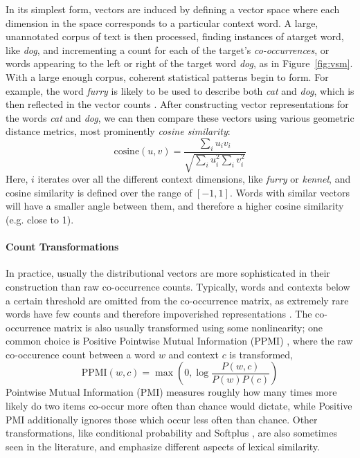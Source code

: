\documentclass[12pt]{article}
\begin{document}
In its simplest form, vectors are induced by defining a vector space where
each dimension in the space corresponds to a particular context word. A large,
unannotated corpus of text is then processed, finding instances of atarget word,
like {\em dog}, and incrementing a count for each of the target's {\em
co-occurrences}, or words appearing to the left or right of the target word
{\em dog}, as in Figure~\ref{fig:vsm}. With a large enough corpus, coherent
statistical patterns begin to form. For example, the word {\em furry} is likely
to be used to describe both {\em cat} and {\em dog}, which is then reflected in
the vector counts \cite{lund:1996:brmic}. After constructing vector
representations for the words {\em cat} and {\em dog}, we can then compare
these vectors using various geometric distance metrics, most prominently {\em
cosine similarity}:
\begin{equation}
  \text{cosine}(u, v) = \frac{\sum_i u_iv_i}{\sqrt{\sum_i u_i^2 \sum_i v_i^2}}
  \label{eq:cos}
\end{equation}
Here, $i$ iterates over all the different context dimensions, like {\em furry}
or {\em kennel}, and cosine similarity is defined over the range of $[-1, 1]$.
Words with similar vectors will have a smaller angle between them, and therefore
a higher cosine similarity (e.g. close to 1).

\paragraph{Count Transformations}
In practice, usually the distributional vectors are more sophisticated in their
construction than raw co-occurrence counts.  Typically, words and contexts
below a certain threshold are omitted from the co-occurrence matrix, as
extremely rare words have few counts and therefore impoverished representations
\cite{turney:2010:jair}. The co-occurrence matrix is also usually transformed
using some nonlinearity; one common choice is Positive Pointwise Mutual
Information (PPMI) \cite{bullinaria:2007:brm}, where the raw co-occurence count
between a word $w$ and context $c$ is transformed,
\begin{equation*}
  \text{PPMI}(w, c) = \max\left(0, \log\frac{P(w, c)}{P(w)P(c)}\right)
\end{equation*}
Pointwise Mutual Information (PMI) measures roughly how many times more likely do two
items co-occur more often than chance would dictate, while Positive PMI
additionally ignores those which occur less often than chance.  Other
transformations, like conditional probability
\cite{hofman:1999:sigir,blei:2003:jmlr} and Softplus
\cite{pennington:2014:emnlp}, are also sometimes seen in the literature, and
emphasize different aspects of lexical similarity.
\end{document}
